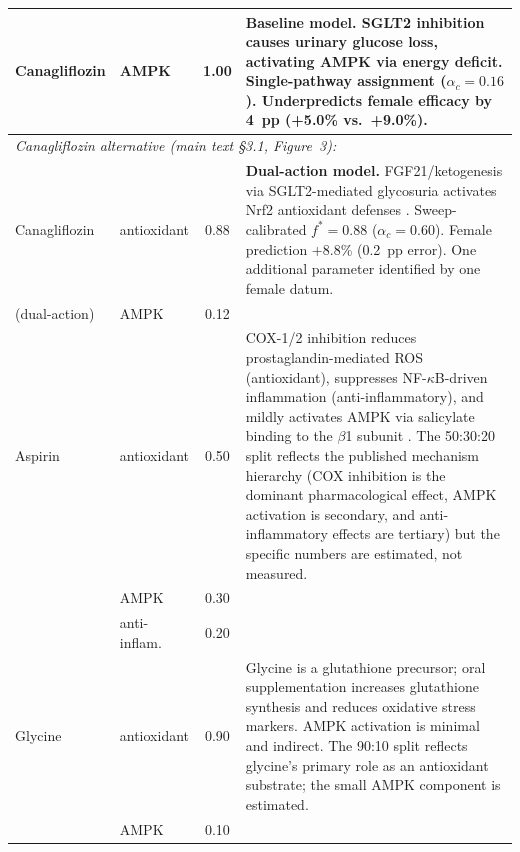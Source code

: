 \documentclass[11pt]{article}
\begin{document}
\begin{longtable}{@{}llcp{7.5cm}@{}}
Canagliflozin & AMPK & 1.00 & \textbf{Baseline model.} SGLT2 inhibition causes urinary glucose loss, activating AMPK via energy deficit. Single-pathway assignment ($\alpha_c = 0.16$). Underpredicts female efficacy by 4~pp (+5.0\% vs.\ +9.0\%). \\
\hline
\multicolumn{4}{l}{\emph{Canagliflozin alternative (main text \S3.1, Figure~3):}} \\
Canagliflozin & antioxidant & 0.88 & \textbf{Dual-action model.} FGF21/ketogenesis via SGLT2-mediated glycosuria activates Nrf2 antioxidant defenses \citep{Ferrannini2016,Osataphan2019,Packer2020}. Sweep-calibrated $f^* = 0.88$ ($\alpha_c = 0.60$). Female prediction +8.8\% (0.2~pp error). One additional parameter identified by one female datum. \\
(dual-action) & AMPK & 0.12 & \\
\hline

Aspirin & antioxidant & 0.50 & COX-1/2 inhibition reduces prostaglandin-mediated ROS (antioxidant), suppresses NF-$\kappa$B-driven inflammation (anti-inflammatory), and mildly activates AMPK via salicylate binding to the $\beta$1 subunit \citep{Egan2004,Grosser2006}. The 50:30:20 split reflects the published mechanism hierarchy (COX inhibition is the dominant pharmacological effect, AMPK activation is secondary, and anti-inflammatory effects are tertiary) but the specific numbers are estimated, not measured. \\
 & AMPK & 0.30 & \\
 & anti-inflam. & 0.20 & \\
\hline

Glycine & antioxidant & 0.90 & Glycine is a glutathione precursor; oral supplementation increases glutathione synthesis and reduces oxidative stress markers. AMPK activation is minimal and indirect. The 90:10 split reflects glycine's primary role as an antioxidant substrate; the small AMPK component is estimated. \\
 & AMPK & 0.10 & \\

\end{longtable}
\end{document}
